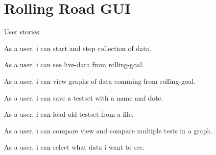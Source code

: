 \section{Rolling Road GUI}
\label{sec:rollingroadgui}

User stories:

As a user, i can start and stop collection of data.

As a user, i can see live-data from rolling-goal.

As a user, i can view graphs of data comming from rolling-goal.

As a user, i can save a testset with a name and date.

As a user, i can load old testset from a file.

As a user, i can compare view and compare multiple tests in a graph.

As a user, i can select what data i want to see.